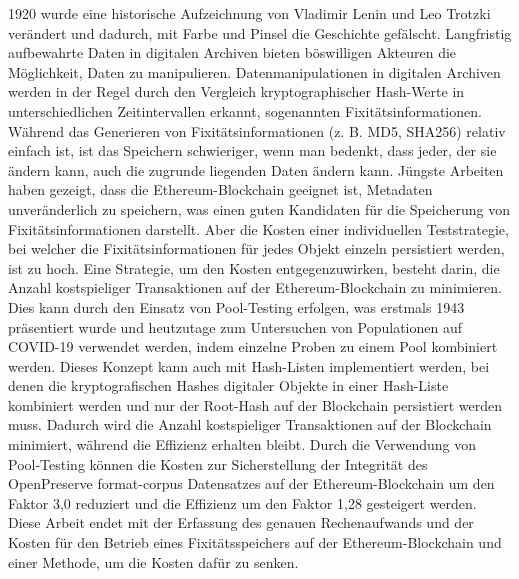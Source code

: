 1920 wurde eine historische Aufzeichnung von Vladimir Lenin und Leo Trotzki verändert und dadurch, mit Farbe und Pinsel die Geschichte gefälscht. Langfristig aufbewahrte Daten in digitalen Archiven bieten böswilligen Akteuren die Möglichkeit, Daten zu manipulieren. Datenmanipulationen in digitalen Archiven werden in der Regel durch den Vergleich kryptographischer Hash-Werte in unterschiedlichen Zeitintervallen erkannt, sogenannten Fixitätsinformationen. Während das Generieren von Fixitätsinformationen (z. B. MD5, SHA256) relativ einfach ist, ist das Speichern schwieriger, wenn man bedenkt, dass jeder, der sie ändern kann, auch die zugrunde liegenden Daten ändern kann.
Jüngste Arbeiten haben gezeigt, dass die Ethereum-Blockchain geeignet ist, Metadaten unveränderlich zu speichern, was einen guten Kandidaten für die Speicherung von Fixitätsinformationen darstellt. Aber die Kosten einer individuellen Teststrategie, bei welcher die Fixitätsinformationen für jedes Objekt einzeln persistiert werden, ist zu hoch. Eine Strategie, um den Kosten entgegenzuwirken, besteht darin, die Anzahl kostspieliger Transaktionen auf der Ethereum-Blockchain zu minimieren. Dies kann durch den Einsatz von Pool-Testing erfolgen, was erstmals 1943 präsentiert wurde und heutzutage zum Untersuchen von Populationen auf COVID-19 verwendet werden, indem einzelne Proben zu einem Pool kombiniert werden. Dieses Konzept kann auch mit Hash-Listen implementiert werden, bei denen die kryptografischen Hashes digitaler Objekte in einer Hash-Liste kombiniert werden und nur der Root-Hash auf der Blockchain persistiert werden muss. Dadurch wird die Anzahl kostspieliger Transaktionen auf der Blockchain minimiert, während die Effizienz erhalten bleibt. Durch die Verwendung von Pool-Testing können die Kosten zur Sicherstellung der Integrität des OpenPreserve format-corpus Datensatzes auf der Ethereum-Blockchain um den Faktor 3,0 reduziert und die Effizienz um den Faktor 1,28 gesteigert werden.
Diese Arbeit endet mit der Erfassung des genauen Rechenaufwands und der Kosten für den Betrieb eines Fixitätsspeichers auf der Ethereum-Blockchain und einer Methode, um die Kosten dafür zu senken.
